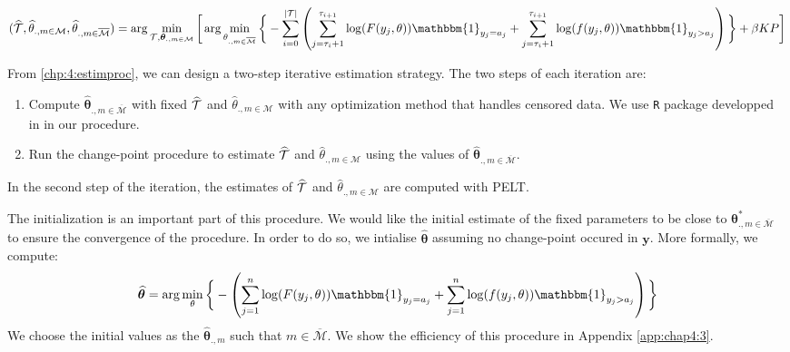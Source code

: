 \begin{dmath}\label{chp:4:estimproc}
(\widehat{\TT},\widehat{\theta}_{.,m\in\mathcal{M}},\widehat{\theta}_{.,m\in\overline{\mathcal{M}}}) = \arg\min_{\TT,\bm \theta_{.,m\in\mathcal{M}}}\bigg[\arg\min_{\theta_{.,m\in\overline{\mathcal{M}}}}\bigg\{ - \sum_{i=0}^{\lvert \TT \rvert}  \left(\sum_{j=\tau_i+1}^{\tau_{i+1}}\log(F(y_j,\theta))\mathbbm{1}_{y_j=a_j}+\sum_{j=\tau_i+1}^{\tau_{i+1}}\log(f(y_j,\theta))\mathbbm{1}_{y_j>a_j}\right)\bigg\}+\beta KP \bigg]
\end{dmath}

From \ref{chp:4:estimproc}, we can design a two-step iterative estimation strategy. The two steps of each iteration are:
\begin{enumerate}
\item Compute $\widehat{\bm\theta}_{{.,m\in\overline{\mathcal{M}}}}$ with fixed $\widehat{{\mathcal T}}$ and $\widehat{\theta}_{.,m\in\mathcal{M}}$ with any optimization method that handles censored data. We use \texttt{R} package developped in \cite{delignette2015} in our procedure.  
\item Run the change-point procedure to estimate $\widehat{{\mathcal T}}$ and $\widehat{\theta}_{.,m\in\mathcal{M}}$ using the values of $\widehat{\bm\theta}_{{.,m\in\overline{\mathcal{M}}}}$.
\end{enumerate} 

In the second step of the iteration, the estimates of $\widehat{{\mathcal T}}$ and $\widehat{\theta}_{.,m\in\mathcal{M}}$ are computed with PELT. 

The initialization is an important part of this procedure. We would like the initial estimate of the fixed parameters to be close to $\bm\theta^*_{{.,m\in\overline{\mathcal{M}}}}$ to ensure the convergence of the procedure. In order to do so, we intialise $\widehat{\bm\theta}$ assuming no change-point occured in $\bm y$.  More formally, we compute: 
\begin{equation}\label{chp:4:init}
\widehat{\bm\theta} = \arg\min_{\theta}\bigg\{ - \left(\sum_{j=1}^{n}\log(F(y_j,\theta))\mathbbm{1}_{y_j=a_j}+\sum_{j=1}^{n}\log(f(y_j,\theta))\mathbbm{1}_{y_j>a_j}\right)\bigg\}
\end{equation}   
We choose the initial values as the $\widehat{\bm\theta}_{.,m}$ such that $m\in\overline{\mathcal{M}}$. We show the efficiency of this procedure in Appendix \ref{app:chap4:3}.  




